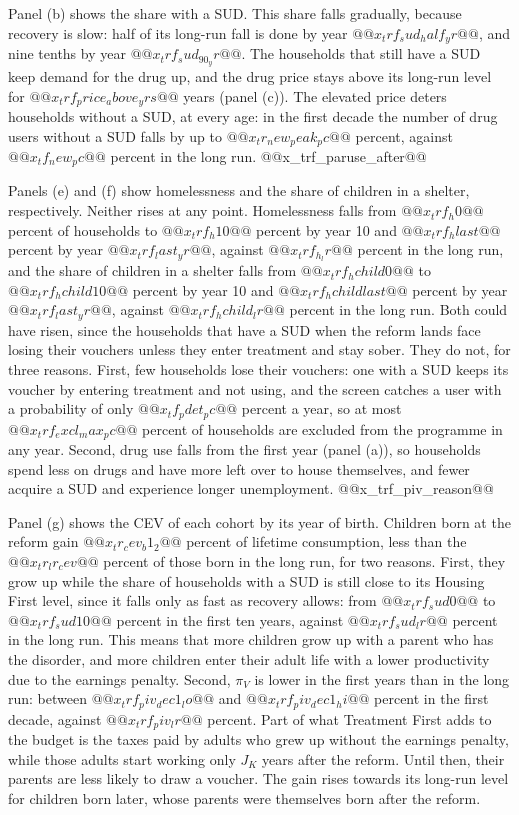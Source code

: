 \documentclass[10pt]{article}
\begin{document}
Panel (b) shows the
share with a SUD. This share falls gradually, because recovery is slow: half of its
long-run fall is done by year $@@x_trf_sud_half_yr@@$, and nine tenths by year
$@@x_trf_sud_90_yr@@$. The households that still have a SUD keep demand for the drug up, and the drug price stays
above its long-run level for $@@x_trf_price_above_yrs@@$ years (panel (c)). The elevated price deters
households without a SUD, at every age: in the first decade the number of drug users without
a SUD falls by up to $@@x_tr_new_peak_pc@@$ percent, against $@@x_tf_new_pc@@$ percent in the
long run. @@x_trf_paruse_after@@

Panels (e) and (f) show homelessness and the share of children in a shelter, respectively. Neither rises at any point. Homelessness falls from $@@x_trf_h0@@$ percent of households to $@@x_trf_h10@@$ percent by year 10 and $@@x_trf_hlast@@$ percent by year $@@x_trf_last_yr@@$, against $@@x_trf_h_lr@@$ percent in the long run, and the share of children in a shelter falls from $@@x_trf_hchild0@@$ to $@@x_trf_hchild10@@$ percent by year 10 and $@@x_trf_hchildlast@@$ percent by year $@@x_trf_last_yr@@$, against $@@x_trf_hchild_lr@@$ percent in the long run. Both could have risen, since the households that have a SUD when the reform lands face losing their vouchers unless they enter treatment and stay sober. They do not, for three reasons. First, few households lose their vouchers: one with a SUD keeps its voucher by entering treatment and not using, and the screen catches a user with a probability of only $@@x_tf_pdet_pc@@$ percent a year, so at most $@@x_trf_excl_max_pc@@$ percent of households are excluded from the programme in any year. Second, drug use falls from the first year (panel (a)), so households spend less on drugs and have more left over to house themselves, and fewer acquire a SUD and experience longer unemployment. @@x_trf_piv_reason@@

Panel (g) shows the CEV of each cohort by its year of birth. Children born at the reform gain $@@x_tr_cev_b1_2@@$ percent of lifetime consumption, less than the $@@x_tr_lr_cev@@$ percent of those born in the long run, for two reasons. First, they grow up while the share of households with a SUD is still close to its Housing First level, since it falls only as fast as recovery allows: from $@@x_trf_sud0@@$ to $@@x_trf_sud10@@$ percent in the first ten years, against $@@x_trf_sud_lr@@$ percent in the long run.  This means that more children grow up with a parent who has the disorder, and more children enter their adult life with a lower productivity due to the earnings penalty. Second, $\pi_V$ is lower in the first years than in the long run: between $@@x_trf_piv_dec1_lo@@$ and $@@x_trf_piv_dec1_hi@@$ percent in the first decade, against $@@x_trf_piv_lr@@$ percent. Part of what Treatment First adds to the budget is the taxes paid by adults who grew up without the earnings penalty, while those adults start working only $J_K$ years after the reform. Until then, their parents are less likely to draw a voucher. The gain rises towards its long-run level for children born later, whose parents were themselves born after the reform.
\end{document}
